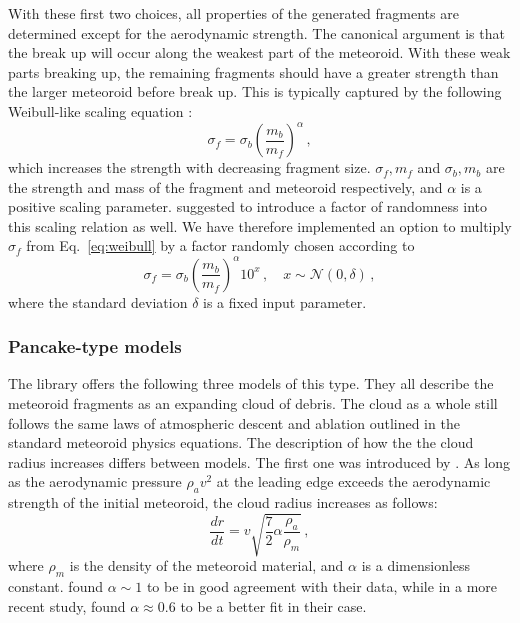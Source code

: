 With these first two choices, all properties of the generated fragments are determined except for the aerodynamic strength. The canonical argument is that the break up will occur along the weakest part of the meteoroid. With these weak parts breaking up, the remaining fragments should have a greater strength than the larger meteoroid before break up. This is typically captured by the following Weibull-like scaling equation \citep{weibull1951statistical,artemieva2001motion}:
\begin{equation}
    \sigma_f = \sigma_b \left(\frac{m_b}{m_f}\right)^\alpha\,,
    \label{eq:weibull}
\end{equation}
which increases the strength with decreasing fragment size. $\sigma_f, m_f$ and $\sigma_b, m_b$ are the strength and mass of the fragment and meteoroid respectively, and $\alpha$ is a positive scaling parameter.
\cite{artemieva2001motion} suggested to introduce a factor of randomness into this scaling relation as well. We have therefore implemented an option to multiply $\sigma_f$ from Eq.~\ref{eq:weibull} by a factor randomly chosen according to
\begin{equation*}
    \sigma_f = \sigma_b \left(\frac{m_b}{m_f}\right)^\alpha 10^x\,,\quad x \sim \mathcal{N}(0, \delta)\,,
\end{equation*}
where the standard deviation $\delta$ is a fixed input parameter.

\subsubsection{Pancake-type models}
\label{sec:cloud_model}
The library offers the following three models of this type. They all describe the meteoroid fragments as an expanding cloud of debris. The cloud as a whole still follows the same laws of atmospheric descent and ablation outlined in the standard meteoroid physics equations. The description of how the the cloud radius increases differs between models. The first one was introduced by \cite{hills1993fragmentation}. As long as the aerodynamic pressure $\rho_a v^2$ at the leading edge exceeds the aerodynamic strength of the initial meteoroid, the cloud radius increases as follows:
\begin{equation}
    \frac{dr}{dt} = v\sqrt{\frac{7}{2}\alpha\frac{\rho_a}{\rho_m}}\,,
    \label{eq:DCM}
\end{equation}
where $\rho_m$ is the density of the meteoroid material, and $\alpha$ is a dimensionless constant. \cite{hills1993fragmentation} found $\alpha \sim 1$ to be in good agreement with their data, while in a more recent study, \cite{wheeler2018atmospheric} found $\alpha \approx 0.6$ to be a better fit in their case. 

